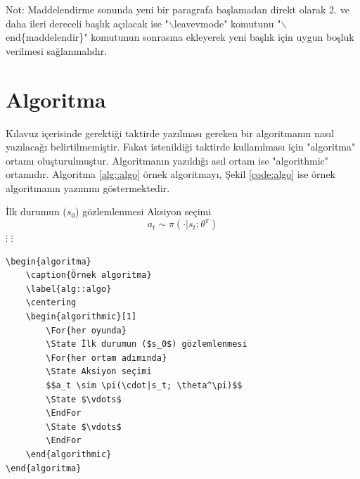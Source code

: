 Not: Maddelendirme sonunda yeni bir paragrafa başlamadan direkt olarak 2. ve daha ileri dereceli başlık açılacak ise "$\backslash$leavevmode" komutunu "$\backslash$end\{maddelendir\}" komutunun sonrasına ekleyerek yeni başlık için uygun boşluk verilmesi sağlanmalıdır.


\chapter{Algoritma}
Kılavuz içerisinde gerektiği taktirde yazılması gereken bir algoritmanın nasıl yazılacağı belirtilmemiştir. Fakat istenildiği taktirde kullanılması için "algoritma" ortamı oluşturulmuştur. Algoritmanın yazıldığı asıl ortam ise "algorithmic" ortamıdır. Algoritma \ref{alg::algo} örnek algoritmayı, Şekil \ref{code:algo} ise örnek algoritmanın yazımını göstermektedir.

\begin{algoritma}
	\caption{Örnek algoritma}
	\label{alg::algo}
	\centering
	\begin{algorithmic}[1]
		\State İlk durumun ($s_0$) gözlemlenmesi
		\State Aksiyon seçimi 
		$$a_t \sim \pi(\cdot|s_t; \theta^\pi)$$
		\State $\vdots$
		\EndFor
		\State $\vdots$
		\EndFor
	\end{algorithmic}
\end{algoritma}

\begin{lstlisting}[language={[LaTeX]{TeX}}, label=code:algo, caption=Örnek algoritma]
\begin{algoritma}
	\caption{Örnek algoritma}
	\label{alg::algo}
	\centering
	\begin{algorithmic}[1]
		\For{her oyunda}
		\State İlk durumun ($s_0$) gözlemlenmesi
		\For{her ortam adımında}
		\State Aksiyon seçimi 
		$$a_t \sim \pi(\cdot|s_t; \theta^\pi)$$
		\State $\vdots$
		\EndFor
		\State $\vdots$
		\EndFor
	\end{algorithmic}
\end{algoritma}
\end{lstlisting}



